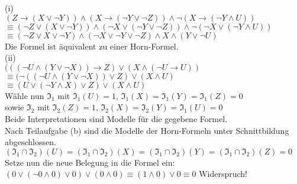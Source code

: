 \documentclass[11pt, a4paper]{article}
\begin{document}
\begin{adjustwidth}{20pt}{20pt}
(i)\\
$(Z \rightarrow (X \vee \neg Y))\wedge (X \rightarrow (\neg Y \vee \neg Z))\wedge\neg(X \rightarrow (\neg Y \wedge U))$\\
$\equiv (\neg Z \vee (X \vee \neg Y))\wedge (\neg X \vee (\neg Y \vee \neg Z))\wedge\neg(\neg X \vee (\neg Y \wedge U))$\\
$\equiv (\neg Z \vee X \vee \neg Y)\wedge (\neg X \vee \neg Y \vee \neg Z)\wedge  X \wedge  (Y \vee \neg U)$\\

Die Formel ist äquivalent zu einer Horn-Formel.\\
(ii)\\
$(((\neg U \wedge (Y \vee \neg X)) \rightarrow Z) \vee (X \wedge (\neg U \rightarrow U))$\\
$\equiv (\neg((\neg U \wedge (Y \vee \neg X)) \vee Z) \vee (X \wedge U)$\\
$\equiv (U \vee (\neg Y \wedge X) \vee Z) \vee (X \wedge U)$\\

Wähle nun $\mathfrak{I_1}$ mit $\mathfrak{I_1}(U)=1$, $\mathfrak{I_1}(X)=\mathfrak{I_1}(Y)=\mathfrak{I_1}(Z)=0$\\
sowie $\mathfrak{I_2}$ mit $\mathfrak{I_2}(Z)=1$, $\mathfrak{I_2}(X)=\mathfrak{I_2}(Y)=\mathfrak{I_1}(U)=0$\\
Beide Interpretationen sind Modelle für die gegebene Formel.\\
Nach Teilaufgabe (b) sind die Modelle der Horn-Formeln unter Schnittbildung abgeschlossen.\\
$(\mathfrak{I_1} \cap \mathfrak{I_2})(U)=(\mathfrak{I_1} \cap \mathfrak{I_2})(X)=(\mathfrak{I_1} \cap \mathfrak{I_2})(Y)=(\mathfrak{I_1} \cap \mathfrak{I_2})(Z)=0$\\

\noindent Setze nun die neue Belegung in die Formel ein:\\

$(0 \vee (\neg 0 \wedge 0) \vee 0) \vee (0 \wedge 0) \equiv (1 \wedge 0) \vee 0 \equiv 0$ \qquad Widerspruch!\\


\end{adjustwidth}
\end{document}
